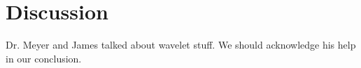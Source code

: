 \documentclass[12pt]{article}
\begin{document}
\section{Discussion}





Dr. Meyer and James talked about wavelet stuff.  We should acknowledge his help in our conclusion.



\end{document}
